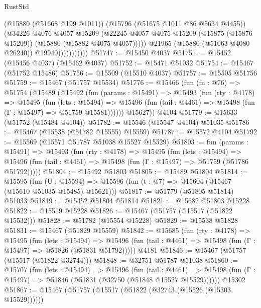 \begin{lexlean}{RustStd}
\begin{coremodule}
                            (@15880 (@51668 @199 @1011))
                            (@15796 (@51675 @1011 @86 @5634 @4455))
                            (@34226
                              @4076
                              @4057
                              @15209
                              (@22245
                                @4057
                                @4075
                                @15209
                                (@15875 (@15876 @15209))
                                (@15880 (@15882 @4075 @4057)))))
                          @21965
                          (@15880 (@51063 @4080 @26240))
                          @19940)))))))))))
@51747 := @15450 @4037
@51751 := @15452 (@15456 @4037) (@15462 @4037)
@51752 := @15471 @51032
@51754 := @15467 (@51752 @15486)
@51756 := @15509 (@15510 @4037)
@51757 := @15505 @51756
@51759 := @15467 (@51757 @15534)
@51776 := @15466
    (fun (fn : @76) =>
    @51754
      (@15489
        (@15492
          (fun (params : @15491) =>
          @15493
            (fun (rty : @4178) =>
            @15495
              (fun (lets : @15494) =>
              @15496 (fun (tail : @4461) => @15498 (fun (Γ : @15497) => @51759 @15581))))))
        @15627))
    @4104
@51779 := @15633 (@51752 (@15484 @4104))
@51782 := @15546 (@15547 @4104) @51035
@51786 := @15467 (@15538 (@51782 @15555) @15559)
@51787 := @15572 @4104
@51792 := @15569 (@15571 @51787 @51038 @15527 @15529)
@51803 := fun (params : @15491) =>
  @15493
    (fun (rty : @4178) =>
    @15495
      (fun (lets : @15494) =>
      @15496 (fun (tail : @4461) => @15498 (fun (Γ : @15497) => @51759 (@51786 @51792)))))
@51804 := @15492 @51803
@51805 := @15489 @51804
@51814 := @15595
    (fun (U : @15594) => @15596 (fun (t : @7) => @15604 (@15467 (@15610 @51035 @15485) @15621)))
@51817 := @51779 (@51805 @51814) @51033
@51819 := @15452 @51804 @51814
@51821 := @15682 @51803 @15228
@51822 := @15519 @15228
@51826 := @15467 (@51757 (@15517 (@51822 @15532)))
@51828 := @51782 (@15554 @15228)
@51829 := @15538 @51828
@51831 := @15467 (@51829 @15559)
@51842 := @15685
    (fun (rty : @4178) =>
    @15495
      (fun (lets : @15494) =>
      @15496 (fun (tail : @4461) => @15498 (fun (Γ : @15497) => @51826 (@51831 @51792)))))
    @4181
@51846 := @15467 (@51757 (@15517 (@51822 @32744)))
@51848 := @32751 @51787 @51038
@51860 := @15707
    (fun (lets : @15494) =>
    @15496
      (fun (tail : @4461) =>
      @15498 (fun (Γ : @15497) => @51846 (@51831 (@32750 (@51848 @15527 @15529))))))
    @15302
@51867 := @15467 (@51757 (@15517 (@51822 (@32743 (@15526 (@15303 @15529))))))

\end{coremodule}
\end{lexlean}
